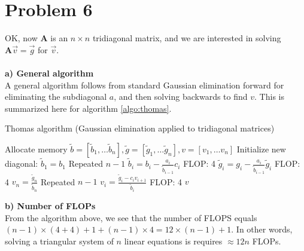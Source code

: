 \documentclass[english,notitlepage]{revtex4}  %
\begin{document}
\section*{Problem 6}
OK, now $\mathbf A$ is an $n\times n$ tridiagonal matrix, and we are interested in solving $\mathbf A \vec v = \vec g$ for $\vec v$.
\\
\\
\textbf{a) General algorithm}
\\
A general algorithm follows from standard Gaussian elimination forward for eliminating the subdiagonal $a$, and then solving backwards to find $v$.
This is summarized  here for algorithm \ref{algo:thomas}.
\begin{algorithm}[H]
    \caption{Thomas algorithm (Gaussian elimination applied to tridiagonal matrices) }\label{algo:thomas}
    \begin{algorithmic}
        \State Allocate memory $\tilde b = \left[\tilde b_1, \ldots \tilde b_n\right], \tilde g = \left[\tilde g_1, \ldots \tilde g_{n}\right], v = \left[v_1, \ldots v_n\right] $
        \State Initialize new diagonal: $\tilde b_1 = b_1$
         \Comment Repeated $n-1$
            \State $\tilde b_i = b_i - \frac{a_i}{\tilde b_{i-1}} c_{i}$ \Comment FLOP: 4
            \State $\tilde g_i = g_i - \frac{a_i}{\tilde b_{i-1}} \tilde g_{i}$ \Comment FLOP: 4
        \EndFor
        \State $v_n = \frac{\tilde g_n}{\tilde b_{n}}$              
         \Comment Repeated $n-1$
            \State $v_i = \frac{\tilde g_i - c_i v_{i+1}}{\tilde b_{i}} $ \Comment FLOP: 4
        \EndFor
        \Return $v$        
    \end{algorithmic}
\end{algorithm}
\textbf{b) Number of FLOPs}
\\
From the algorithm above, we see that the number of FLOPS equals $(n-1)\times(4 + 4) + 1 + (n-1)\times 4 = 12 \times (n-1) + 1$. In other words, solving a triangular system of $n$ linear equations is requires $\approx 12 n$ FLOPs.
\end{document}
